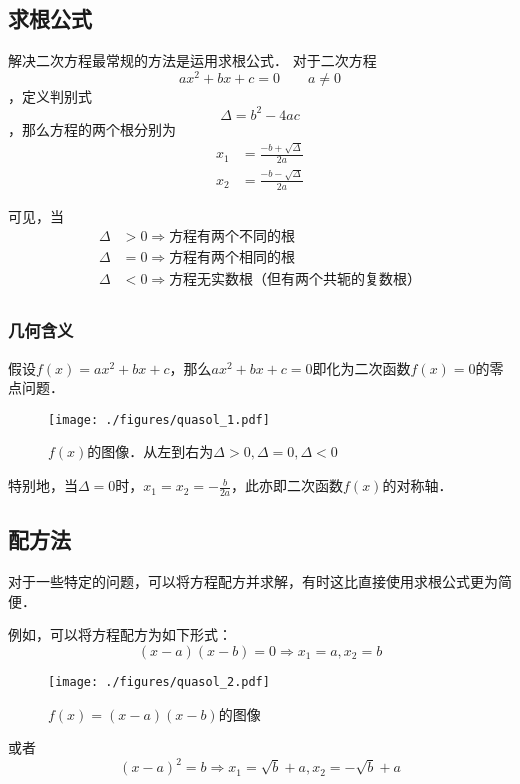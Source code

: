 
\subsection{求根公式}
解决二次方程最常规的方法是运用求根公式．
对于二次方程$$ax^2+bx+c=0 \qquad a\neq 0$$，定义判别式$$\Delta = b^2-4ac$$，那么方程的两个根分别为$$
\begin{aligned}
x_1&=\frac{-b+\sqrt{\Delta}}{2a}\\
x_2&=\frac{-b-\sqrt{\Delta}}{2a}
\end{aligned}
$$

可见，当
$$
\begin{aligned}
\Delta &> 0 \Rightarrow \text{方程有两个不同的根}\\
\Delta &= 0 \Rightarrow \text{方程有两个相同的根}\\
\Delta &< 0 \Rightarrow \text{方程无实数根（但有两个共轭的复数根）}\\
\end{aligned}
$$

\subsubsection{几何含义}
假设$f(x)=ax^2+bx+c$，那么$ax^2+bx+c=0$即化为二次函数$f(x)=0$的零点问题．
\begin{figure}[ht]
\centering
\texttt{[image: ./figures/quasol\_1.pdf]}
\caption{$f(x)$的图像．从左到右为$\Delta > 0, \Delta = 0, \Delta < 0$} \label{quasol_fig1}
\end{figure}
特别地，当$\Delta =0$时，$x_1=x_2=-\frac{b}{2a}$，此亦即二次函数$f(x)$的对称轴．

\subsection{配方法}
对于一些特定的问题，可以将方程配方并求解，有时这比直接使用求根公式更为简便．

例如，可以将方程配方为如下形式：
$$(x-a)(x-b)=0\Rightarrow x_1=a, x_2=b$$
\begin{figure}[ht]
\centering
\texttt{[image: ./figures/quasol\_2.pdf]}
\caption{$f(x)=(x-a)(x-b)$的图像} \label{quasol_fig2}
\end{figure}

或者
$$(x-a)^2=b\Rightarrow x_1=\sqrt{b}+a, x_2=-\sqrt{b}+a$$
